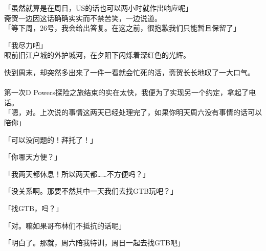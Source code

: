 「虽然就算是在周日，US的话也可以两小时就作出响应呢」\\

斋贺一边因这话确确实实而不禁苦笑，一边说道。\\

「等下周，26号，我会给出答复。在这之前，很抱歉我们只能暂且保留了」

「我尽力吧」\\

眼前旧江户城的外护城河，在夕阳下闪烁着深红色的光辉。

快到周末，却突然多出来了一件一看就会忙死的活，斋贺长长地叹了一大口气。\\

\sqsplit\\

第一次D Powers探险之旅结束的实在太快，我便为了实现另一个约定，拿起了电话。\\

「嗯，对。上次说的事情这两天已经处理完了，如果你明天周六没有事情的话可以陪你」

「可以没问题的！拜托了！」

「你哪天方便？」

「我两天都休息！所以两天都……不方便吗？」

「没关系啊。那要不然其中一天我们去找GTB玩吧？」

「找GTB，吗？」

「对。嘛如果哥布林们不抵抗的话呢」

「明白了。那就，周六陪我特训，周日一起去找GTB吧」

